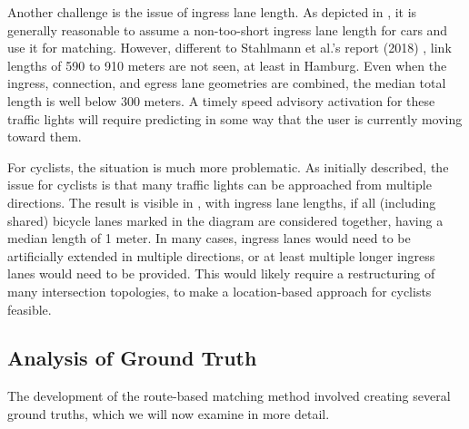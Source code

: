 Another challenge is the issue of ingress lane length. As depicted in , it is generally reasonable to assume a non-too-short ingress lane length for cars and use it for matching. However, different to Stahlmann et al.'s report (2018) \cite{stahlmann_exploring_2018}, link lengths of 590 to 910 meters are not seen, at least in Hamburg. Even when the ingress, connection, and egress lane geometries are combined, the median total length is well below 300 meters. A timely speed advisory activation for these traffic lights will require predicting in some way that the user is currently moving toward them.

For cyclists, the situation is much more problematic. As initially described, the issue for cyclists is that many traffic lights can be approached from multiple directions. The result is visible in , with ingress lane lengths, if all (including shared) bicycle lanes marked in the diagram are considered together, having a median length of 1 meter. In many cases, ingress lanes would need to be artificially extended in multiple directions, or at least multiple longer ingress lanes would need to be provided. This would likely require a restructuring of many intersection topologies, to make a location-based approach for cyclists feasible.

\subsection{Analysis of Ground Truth}

The development of the route-based matching method involved creating several ground truths, which we will now examine in more detail.

